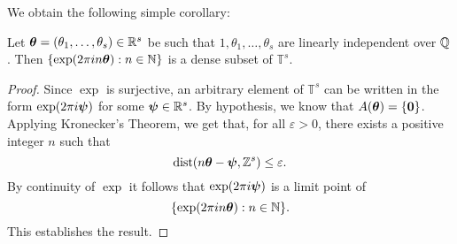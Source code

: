 We obtain the following simple corollary:
\begin{corollary}
  Let $\boldsymbol{\theta} = (\theta_{1}, \ldots, \theta_{s}) \in \mathbb{R}^{s}$ be such that $1, \theta_1, \ldots, \theta_s$ are linearly independent over $\mathbb{Q}$.
  Then $\lbrace \exp(2 \pi i n \boldsymbol{\theta}) : n \in \mathbb{N} \rbrace$ is a dense subset of $\mathbb{T}^s$.
\label{corl:kronecker}
\end{corollary}
\begin{proof}
Since $\exp$ is surjective, an arbitrary element of $\mathbb{T}^{s}$ can be written in the form $\exp(2 \pi i \boldsymbol{\psi})$ for some $\boldsymbol{\psi} \in \mathbb{R}^{s}$. By hypothesis, we know that $A(\boldsymbol{\theta}) = \lbrace \boldsymbol{0} \rbrace$. Applying Kronecker's Theorem, we get that, for all $\varepsilon > 0$, there exists a positive integer $n$ such that
\begin{equation*}
  \operatorname{dist}(n \boldsymbol{\theta} - \boldsymbol{\psi}, \mathbb{Z}^{s}) \leq \varepsilon .
\end{equation*}
By continuity of $\exp$ it follows that $\exp(2 \pi i \boldsymbol{\psi})$ is a limit point of
\begin{equation*}
\lbrace \exp(2 \pi i n \boldsymbol{\theta}) : n \in \mathbb{N} \rbrace .
\end{equation*}
This establishes the result.
\end{proof}
